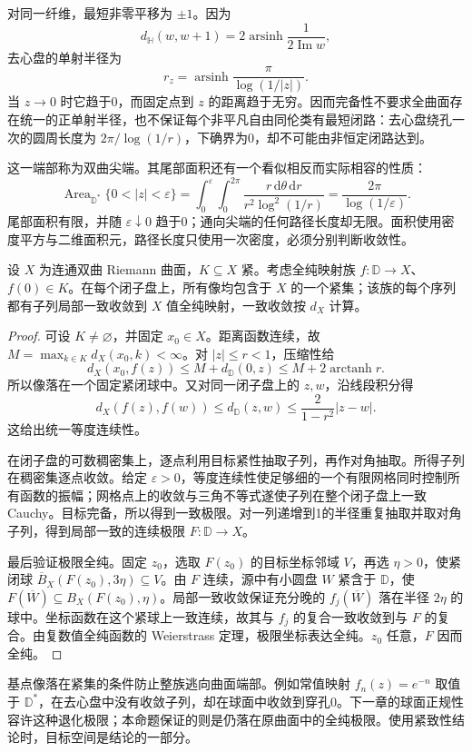\ProseParagraphBreak
对同一纤维，最短非零平移为 \(\pm1\)。因为
\[
 d_{\mathbb H}(w,w+1)=2\operatorname{arsinh}\frac1{2\operatorname{Im}w},
\]
去心盘的单射半径为
\[
 r_z=\operatorname{arsinh}\frac{\pi}{\log(1/|z|)}.
\]
当 \(z\to0\) 时它趋于0，而固定点到 \(z\) 的距离趋于无穷。因而完备性不要求全曲面存在统一的正单射半径，也不保证每个非平凡自由同伦类有最短闭路：去心盘绕孔一次的圆周长度为 \(2\pi/\log(1/r)\)，下确界为0，却不可能由非恒定闭路达到。

\ProseParagraphBreak
这一端部称为双曲尖端。其尾部面积还有一个看似相反而实际相容的性质：
\[
 \operatorname{Area}_{\mathbb D^*}\{0<|z|<\varepsilon\}
 =\int_0^\varepsilon\int_0^{2\pi}
   \frac{r\,\mathrm d\theta\,\mathrm dr}{r^2\log^2(1/r)}
 =\frac{2\pi}{\log(1/\varepsilon)}.
\]
尾部面积有限，并随 \(\varepsilon\downarrow0\) 趋于0；通向尖端的任何路径长度却无限。面积使用密度平方与二维面积元，路径长度只使用一次密度，必须分别判断收敛性。

\begin{proposition}[固定像值的紧致控制]\label{b3:prop:13-anchored-maps}
设 \(X\) 为连通双曲 Riemann 曲面，\(K\subseteq X\) 紧。考虑全纯映射族 \(f:\mathbb D\to X\)、\(f(0)\in K\)。在每个闭子盘上，所有像均包含于 \(X\) 的一个紧集；该族的每个序列都有子列局部一致收敛到 \(X\) 值全纯映射，一致收敛按 \(d_X\) 计算。
\end{proposition}
\begin{proof}
可设 \(K\ne\varnothing\)，并固定 \(x_0\in X\)。距离函数连续，故 \(M=\max_{k\in K}d_X(x_0,k)<\infty\)。对 \(|z|\le r<1\)，压缩性给
\[
 d_X(x_0,f(z))\le M+d_{\mathbb D}(0,z)
 \le M+2\operatorname{arctanh}r.
\]
所以像落在一个固定紧闭球中。又对同一闭子盘上的 \(z,w\)，沿线段积分得
\[
 d_X(f(z),f(w))\le d_{\mathbb D}(z,w)
 \le\frac{2}{1-r^2}|z-w|.
\]
这给出统一等度连续性。

在闭子盘的可数稠密集上，逐点利用目标紧性抽取子列，再作对角抽取。所得子列在稠密集逐点收敛。给定 \(\varepsilon>0\)，等度连续性使足够细的一个有限网格同时控制所有函数的振幅；网格点上的收敛与三角不等式遂使子列在整个闭子盘上一致 Cauchy。目标完备，所以得到一致极限。对一列递增到1的半径重复抽取并取对角子列，得到局部一致的连续极限 \(F:\mathbb D\to X\)。

最后验证极限全纯。固定 \(z_0\)，选取 \(F(z_0)\) 的目标坐标邻域 \(V\)，再选 \(\eta>0\)，使紧闭球 \(\overline B_X(F(z_0),3\eta)\subseteq V\)。由 \(F\) 连续，源中有小圆盘 \(W\) 紧含于 \(\mathbb D\)，使 \(F(\overline W)\subseteq B_X(F(z_0),\eta)\)。局部一致收敛保证充分晚的 \(f_j(\overline W)\) 落在半径 \(2\eta\) 的球中。坐标函数在这个紧球上一致连续，故其与 \(f_j\) 的复合一致收敛到与 \(F\) 的复合。由复数值全纯函数的 Weierstrass 定理，极限坐标表达全纯。\(z_0\) 任意，\(F\) 因而全纯。
\end{proof}
基点像落在紧集的条件防止整族逃向曲面端部。例如常值映射 \(f_n(z)=e^{-n}\) 取值于 \(\mathbb D^*\)，在去心盘中没有收敛子列，却在球面中收敛到穿孔0。下一章的球面正规性容许这种退化极限；本命题保证的则是仍落在原曲面中的全纯极限。使用紧致性结论时，目标空间是结论的一部分。
